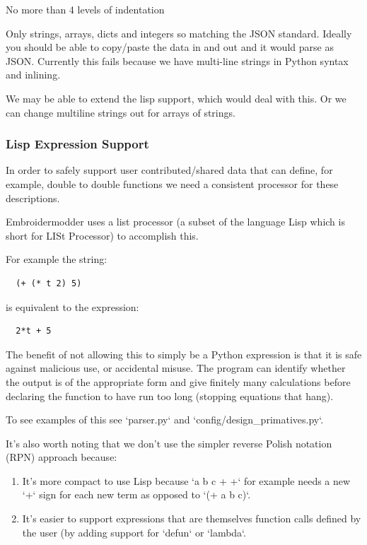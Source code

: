 \documentclass[a4paper, 11pt]{report}
\begin{document}
No more than 4 levels of indentation

Only strings, arrays, dicts and integers so matching the JSON standard. Ideally you should be able to copy/paste the data in and out and it would parse as JSON. Currently this fails because we have multi-line strings in Python syntax and inlining.

We may be able to extend the lisp support, which would deal with this. Or we can change multiline strings out for arrays of strings.

\subsubsection{Lisp Expression Support}

In order to safely support user contributed/shared data that can
define, for example, double to double functions we need a consistent
processor for these descriptions.

Embroidermodder uses a list processor (a subset of the language
Lisp which is short for LISt Processor) to accomplish this.

For example the string:

\begin{verbatim}
  (+ (* t 2) 5)
\end{verbatim}

is equivalent to the expression:

\begin{verbatim}
  2*t + 5
\end{verbatim}

The benefit of not allowing this to simply be a Python expression
is that it is safe against malicious use, or accidental misuse.
The program can identify whether the output is of the appropriate
form and give finitely many calculations before declaring the
function to have run too long (stopping equations that hang).

To see examples of this see `parser.py` and
`config/design\_primatives.py`.

It's also worth noting that we don't use the simpler reverse Polish
notation (RPN) approach because:

\begin{enumerate}
\item It's more compact to use Lisp because `a b c + +` for example needs a new `+` sign for each new term as opposed to `(+ a b c)`.
\item It's easier to support expressions that are themselves function calls defined by the user (by adding support for `defun` or `lambda`.
\end{enumerate}
\end{document}
